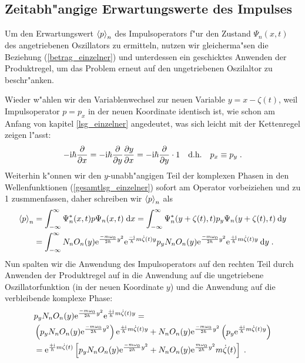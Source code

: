   \subsection{Zeitabh"angige Erwartungswerte des Impulses}
    Um den Erwartungswert $\braket{p}_n$ des Impulsoperators f"ur den Zustand $\Psi_n(x,t)$ des angetriebenen Oszillators zu ermitteln, nutzen wir gleicherma"sen die Beziehung (\ref{betrag_einzelner}) und unterdessen ein geschicktes Anwenden der Produktregel, um das Problem erneut auf den ungetriebenen Oszilaltor zu beschr"anken.

    Wieder w"ahlen wir den Variablenwechsel zur neuen Variable $y=x-\zeta(t)$, weil Impulsoperator $p=p_x$ in der neuen Koordinate identisch ist, wie schon am Anfang von kapitel \ref{lsg_einzelner} angedeutet, was sich leicht mit der Kettenregel zeigen l"asst:
    \begin{equation}
      -\text i\hbar \frac{\partial}{\partial x} = -\text i\hbar \frac{\partial}{\partial y}\frac{\partial y}{\partial x} = -\text i\hbar \frac{\partial}{\partial y} \cdot 1 \quad \text{d.h.} \quad p_x \equiv p_y \; .
    \end{equation}
    Weiterhin k"onnen wir den $y$-unabh"angigen Teil der komplexen Phasen in den Wellenfunktionen (\ref{gesamtlsg_einzelner}) sofort am Operator vorbeiziehen und zu 1 zusmmenfassen, daher schreiben wir $\braket{p}_n$ als
    \begin{align}
      \braket{p}_n &= \int_{-\infty}^{\infty} \Psi^*_n(x,t) p \Psi_n(x,t) \; \text dx
      = \int_{-\infty}^{\infty} \Psi^*_n(y+\zeta(t),t) p_y \Psi_n(y+\zeta(t),t) \: \text dy \notag\\
      &= \int_{-\infty}^{\infty} N_nO_n(y)\text e^{\frac{-m\omega_0}{2\hbar}y^2}\text e^{\frac{-\text i}{\hbar}m\dot{\zeta}(t)y} p_y N_nO_n(y)\text e^{\frac{-m\omega_0}{2\hbar}y^2}\text e^{\frac{+\text i}{\hbar}m\dot{\zeta}(t)y} \: \text dy \; .
      \label{spaste}
    \end{align}
    Nun spalten wir die Anwendung des Impulsoperators auf den rechten Teil durch Anwenden der Produktregel auf in die Anwendung auf die ungetriebene Oszillatorfunktion (in der neuen Koordinate $y$) und die Anwendung auf die verbleibende komplexe Phase:
    \begin{align}
      &p_y N_nO_n(y)\text e^{\frac{-m\omega_0}{2\hbar}y^2}\text e^{\frac{+\text i}{\hbar}m\dot{\zeta}(t)y} = \notag\\
      &\left(p_y N_nO_n(y)\text e^{\frac{-m\omega_0}{2\hbar}y^2}\right) \text e^{\frac{+\text i}{\hbar}m\dot{\zeta}(t)y}
      + N_nO_n(y)\text e^{\frac{-m\omega_0}{2\hbar}y^2} \left(p_y \text e^{\frac{+\text i}{\hbar}m\dot{\zeta}(t)y}\right) \notag\\
      &= \text e^{\frac{+\text i}{\hbar}m\dot{\zeta}(t)} \left[p_yN_nO_n(y)\text e^{\frac{-m\omega_0}{2\hbar}y^2} + N_nO_n(y)\text e^{\frac{m\omega_0}{2\hbar}y^2}m\dot{\zeta}(t) \right] \; .
      \label{spaste2}
    \end{align}
